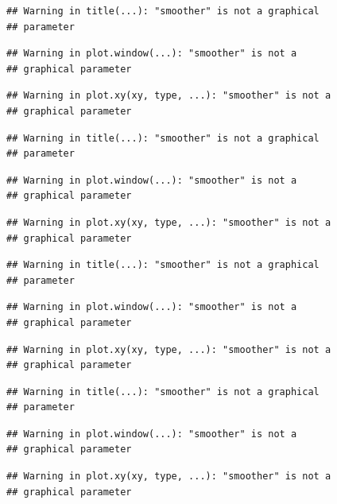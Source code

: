 \documentclass[12pt,]{krantz}
\begin{document}
\begin{verbatim}
## Warning in title(...): "smoother" is not a graphical
## parameter
\end{verbatim}

\begin{verbatim}
## Warning in plot.window(...): "smoother" is not a
## graphical parameter
\end{verbatim}

\begin{verbatim}
## Warning in plot.xy(xy, type, ...): "smoother" is not a
## graphical parameter
\end{verbatim}

\begin{verbatim}
## Warning in title(...): "smoother" is not a graphical
## parameter
\end{verbatim}

\begin{verbatim}
## Warning in plot.window(...): "smoother" is not a
## graphical parameter
\end{verbatim}

\begin{verbatim}
## Warning in plot.xy(xy, type, ...): "smoother" is not a
## graphical parameter
\end{verbatim}

\begin{verbatim}
## Warning in title(...): "smoother" is not a graphical
## parameter
\end{verbatim}

\begin{verbatim}
## Warning in plot.window(...): "smoother" is not a
## graphical parameter
\end{verbatim}

\begin{verbatim}
## Warning in plot.xy(xy, type, ...): "smoother" is not a
## graphical parameter
\end{verbatim}

\begin{verbatim}
## Warning in title(...): "smoother" is not a graphical
## parameter
\end{verbatim}

\begin{verbatim}
## Warning in plot.window(...): "smoother" is not a
## graphical parameter
\end{verbatim}

\begin{verbatim}
## Warning in plot.xy(xy, type, ...): "smoother" is not a
## graphical parameter
\end{verbatim}
\end{document}
